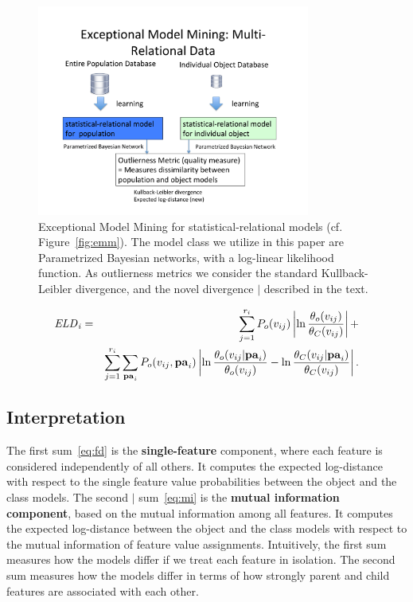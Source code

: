 {\begin{figure}[htbp]
	\centering
\includegraphics[width=0.8\textwidth]{emm-srl.pdf}
	\caption{Exceptional Model Mining for statistical-relational models (cf. Figure~\ref{fig:emm}). The model class we utilize in this paper are Parametrized Bayesian networks, with a log-linear likelihood function. As outlierness metrics we consider the standard Kullback-Leibler divergence, and the novel divergence $\mid$ described in the text.
		\label{fig:flow}}
\end{figure}


\begin{eqnarray}
\it{ELD}_{i} & = & \sum_{j=1}^{r_{i}} P_{o}(v_{ij}) \left|\ln \frac{\theta_{o}( v_{ij})}{\theta_{C}( v_{ij})}\right|+ \label{eq:fd}\\
& & \sum_{j=1}^{r_{i}} \sum_{\mathbf{pa}_{i}} 
P_{o}( v_{ij},\mathbf{pa}_{i})
\left|\ln \frac{\theta_{o}( v_{ij}|\mathbf{pa}_{i})}{\theta_{o}(v_{ij})} - \ln \frac{\theta_{C}( v_{ij}|\mathbf{pa}_{i})}{\theta_{C}(v_{ij})}\right|. \label{eq:mi}
\end{eqnarray}

\subsection{Interpretation}

The first sum~\eqref{eq:fd} is the \textbf{single-feature} component, where each feature is considered independently of all others. It computes the expected log-distance with respect to  the single feature value probabilities between the object and the class models. 
%
The second $\mid$ sum~\eqref{eq:mi} is the \textbf{mutual information component}, based on the mutual information among all features. It computes the expected log-distance between the object and the class models with respect to the mutual information of feature value assignments.
Intuitively, the first sum measures how the models differ if we treat each feature in isolation. The second sum measures how the models differ in terms of how strongly parent and child features are associated with each other. 


}
